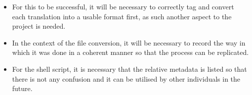 \documentclass{article}
\begin{document}
\begin{itemize}
    \item{For this to be successful, it will be necessary to correctly tag and convert each translation into a usable format first, as such another aspect to the project is needed.}
    
\item{In the context of the file conversion, it will be necessary to record the way in which it was done in a coherent manner so that the process can be replicated.}

\item{For the shell script, it is necessary that the relative metadata is listed so that there is not any confusion and it can be utilised by other individuals in the future.}
\end{itemize}
\end{document}
